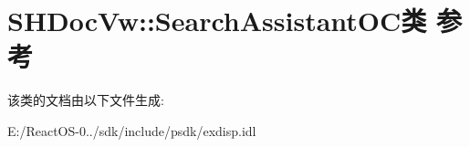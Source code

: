 \hypertarget{class_s_h_doc_vw_1_1_search_assistant_o_c}{}\section{S\+H\+Doc\+Vw\+:\+:Search\+Assistant\+O\+C类 参考}
\label{class_s_h_doc_vw_1_1_search_assistant_o_c}


该类的文档由以下文件生成\+:\begin{DoxyCompactItemize}
\item 
E\+:/\+React\+O\+S-\/0../sdk/include/psdk/exdisp.\+idl\end{DoxyCompactItemize}
